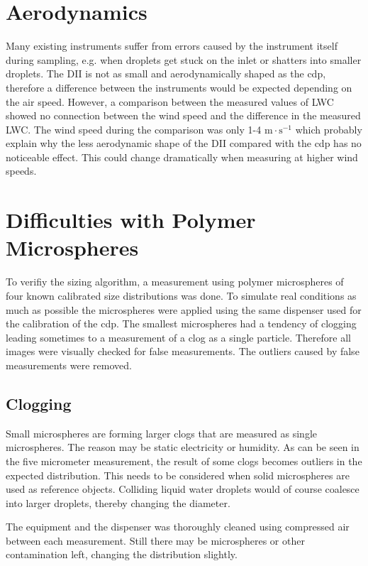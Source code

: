 \section{Aerodynamics}

Many existing instruments suffer from errors caused by the instrument itself during sampling, e.g. when droplets get stuck on the inlet or shatters into smaller droplets. The DII is not as small and aerodynamically shaped as the \gls{cdp}, therefore a difference between the instruments would be expected depending on the air speed. However, a comparison between the measured values of LWC showed no connection between the wind speed and the difference in the measured LWC. The wind speed during the comparison was only 1-4 $\mathrm{m \cdot s^{-1}}$ which probably explain why the less aerodynamic shape of the DII compared with the \gls{cdp} has no noticeable effect. This could change dramatically when measuring at higher wind speeds.

\section{Difficulties with Polymer Microspheres}

To verifiy the sizing algorithm, a measurement using polymer microspheres of four known calibrated size distributions was done. To simulate real conditions as much as possible the microspheres were applied using the same dispenser used for the calibration of the \gls{cdp}. The smallest microspheres had a tendency of clogging leading sometimes to a measurement of a clog as a single particle. Therefore all images were visually checked for false measurements. The outliers caused by false measurements were removed.

\subsection{Clogging}

Small microspheres are forming larger clogs that are measured as single microspheres. The reason may be static electricity or humidity. As can be seen in the five micrometer measurement, the result of some clogs becomes outliers in the expected distribution. This needs to be considered when solid microspheres are used as reference objects. Colliding liquid water droplets would of course coalesce into larger droplets, thereby changing the diameter.

The equipment and the dispenser was thoroughly cleaned using compressed air between each measurement. Still there may be microspheres or other contamination left, changing the distribution slightly.


